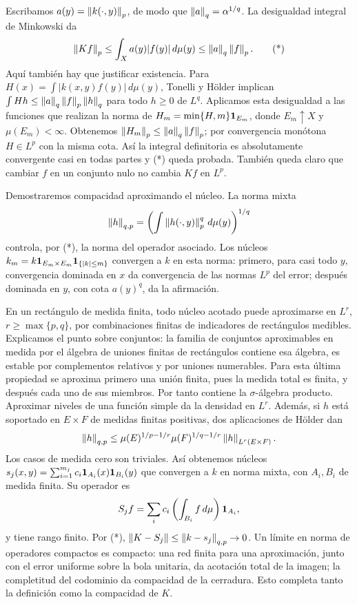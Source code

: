 \begin{solucion}
Escribamos $a(y)=\left\lVert k(\cdot,y)\right\rVert_p$, de modo que $\left\lVert a\right\rVert_q=\alpha^{1/q}$. La desigualdad integral de Minkowski da
\[
 \left\lVert Kf\right\rVert_p\le\int_X a(y)|f(y)|\,d\mu(y)\le\left\lVert a\right\rVert_q\left\lVert f\right\rVert_p. \tag{*}
\]
Aquí también hay que justificar existencia. Para $H(x)=\int|k(x,y)f(y)|\,d\mu(y)$, Tonelli y Hölder implican $\int Hh\le\left\lVert a\right\rVert_q\left\lVert f\right\rVert_p\left\lVert h\right\rVert_q$ para todo $h\ge0$ de $L^q$. Aplicamos esta desigualdad a las funciones que realizan la norma de $H_m=\min\{H,m\}\mathbf1_{E_m}$, donde $E_m\uparrow X$ y $\mu(E_m)<\infty$. Obtenemos $\left\lVert H_m\right\rVert_p\le\left\lVert a\right\rVert_q\left\lVert f\right\rVert_p$; por convergencia monótona $H\in L^p$ con la misma cota. Así la integral definitoria es absolutamente convergente casi en todas partes y (*) queda probada. También queda claro que cambiar $f$ en un conjunto nulo no cambia $Kf$ en $L^p$.

Demostraremos compacidad aproximando el núcleo. La norma mixta
\[
 \left\lVert h\right\rVert_{q,p}=\left(\int\left\lVert h(\cdot,y)\right\rVert_p^q\,d\mu(y)\right)^{1/q}
\]
controla, por (*), la norma del operador asociado. Los núcleos $k_m=k\mathbf1_{E_m\times E_m}\mathbf1_{\{|k|\le m\}}$ convergen a $k$ en esta norma: primero, para casi todo $y$, convergencia dominada en $x$ da convergencia de las normas $L^p$ del error; después dominada en $y$, con cota $a(y)^q$, da la afirmación.

En un rectángulo de medida finita, todo núcleo acotado puede aproximarse en $L^r$, $r\ge\max\{p,q\}$, por combinaciones finitas de indicadores de rectángulos medibles. Explicamos el punto sobre conjuntos: la familia de conjuntos aproximables en medida por el álgebra de uniones finitas de rectángulos contiene esa álgebra, es estable por complementos relativos y por uniones numerables. Para esta última propiedad se aproxima primero una unión finita, pues la medida total es finita, y después cada uno de sus miembros. Por tanto contiene la $\sigma$-álgebra producto. Aproximar niveles de una función simple da la densidad en $L^r$. Además, si $h$ está soportado en $E\times F$ de medidas finitas positivas, dos aplicaciones de Hölder dan
\[
 \left\lVert h\right\rVert_{q,p}\le\mu(E)^{1/p-1/r}\mu(F)^{1/q-1/r}\left\lVert h\right\rVert_{L^r(E\times F)}.
\]
Los casos de medida cero son triviales. Así obtenemos núcleos $s_j(x,y)=\sum_{i=1}^{m_j}c_i\mathbf1_{A_i}(x)\mathbf1_{B_i}(y)$ que convergen a $k$ en norma mixta, con $A_i,B_i$ de medida finita. Su operador es
\[
 S_jf=\sum_i c_i\left(\int_{B_i}f\,d\mu\right)\mathbf1_{A_i},
\]
y tiene rango finito. Por (*), $\left\lVert K-S_j\right\rVert\le\left\lVert k-s_j\right\rVert_{q,p}\to0$. Un límite en norma de operadores compactos es compacto: una red finita para una aproximación, junto con el error uniforme sobre la bola unitaria, da acotación total de la imagen; la completitud del codominio da compacidad de la cerradura. Esto completa tanto la definición como la compacidad de $K$.
\end{solucion}

